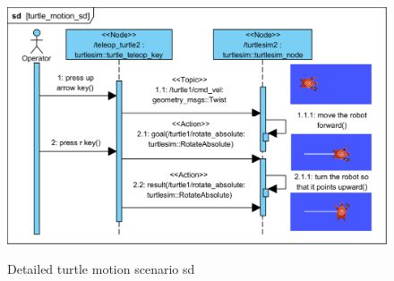 \documentclass[11pt,oneside,a4paper]{report}
\begin{document}
\begin{figure}[H]
	\centering
	\begin{center}
		{\includegraphics[scale=.9]{diagrams/turtle_motion_sd.png}}
	\end{center}
	\caption{Detailed turtle motion scenario sd}
	\label{fig:turtle_motion_sd}
\end{figure}
			
\AtNextBibliography{\small}
\printbibliography
	
\end{document}
